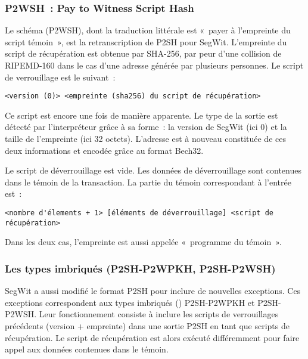 \subsubsection*{P2WSH~: Pay to Witness Script Hash} Le schéma  (P2WSH), dont la traduction littérale est «~payer à l'empreinte du script témoin~», est la retranscription de P2SH pour SegWit. L'empreinte du script de récupération est obtenue par SHA-256, par peur d'une collision de RIPEMD-160 dans le cas d'une adresse générée par plusieurs personnes. Le script de verrouillage est le suivant~:

\begin{Verbatim}[fontsize=\footnotesize]
<version (0)> <empreinte (sha256) du script de récupération>
\end{Verbatim}

Ce script est encore une fois  de manière apparente. Le type de la sortie est détecté par l'interpréteur grâce à sa forme~: la version de SegWit (ici 0) et la taille de l'empreinte (ici 32 octets). L'adresse est à nouveau constituée de ces deux informations et encodée grâce au format Bech32.

Le script de déverrouillage est vide. Les données de déverrouillage sont contenues dans le témoin de la transaction. La partie du témoin correspondant à l'entrée est~:

\begin{Verbatim}[fontsize=\footnotesize]
<nombre d'élements + 1> [éléments de déverrouillage] <script de
récupération>
\end{Verbatim}

Dans les deux cas, l'empreinte est aussi appelée «~programme du témoin~».

\subsubsection*{Les types imbriqués (P2SH-P2WPKH, P2SH-P2WSH)} SegWit a aussi modifié le format P2SH pour inclure de nouvelles exceptions. Ces exceptions correspondent aux types imbriqués () P2SH-P2WPKH et P2SH-P2WSH. Leur fonctionnement consiste à inclure les scripts de verrouillages précédents (version + empreinte) dans une sortie P2SH en tant que scripts de récupération. Le script de récupération est alors exécuté différemment pour faire appel aux données contenues dans le témoin.

